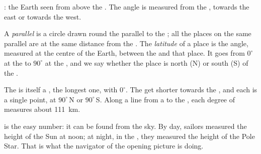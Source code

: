 \begin{omfigure}
\begin{minipage}[t]{0.48\linewidth}
{\small {}: the Earth seen from above the . The angle is
measured from the , towards the east or towards the west.}
\end{minipage}
\end{omfigure}

\begin{definition}\label{def:g6:latitude-longitude:latitude}
A \emph{parallel} is a circle drawn round the  parallel
to the ; all the places on the same parallel are at the same distance
from the . The \emph{latitude} of a place is the angle,
measured at the centre of the Earth, between the  and that place. It
goes from $0^\circ$ at the  to $90^\circ$ at the , and we say
whether the place is north (N) or south (S) of the .
\end{definition}

The  is itself a , the longest one, with  $0^\circ$.
The  get shorter towards the , and each  is a single
point, at $90^\circ$\,N or $90^\circ$\,S. Along a line from a  to the
, each degree of  measures about \qty{111}{km}.

 is the easy number: it can be found from the sky. By day,
sailors measured the height of the Sun at noon; at night, in the , they measured the height of the Pole Star. That is what the
navigator of the opening picture is doing.

